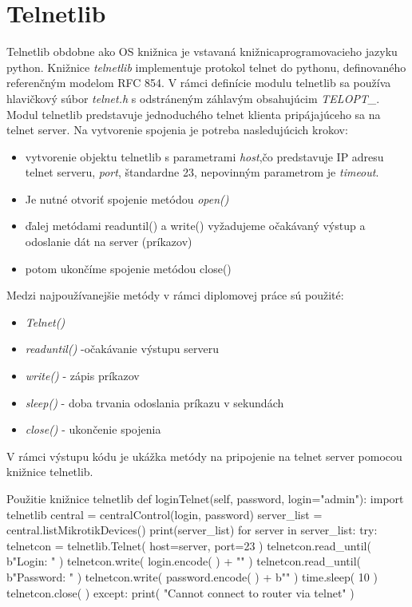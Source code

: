 \section{Telnetlib}
Telnetlib \cite{telnetlib} obdobne ako OS knižnica je vstavaná knižnicaprogramovacieho jazyku python. Knižnice \textit{telnetlib} implementuje protokol telnet do pythonu, definovaného referenčným modelom RFC 854. V rámci definície modulu telnetlib sa používa hlavičkový súbor \textit{telnet.h} s odstráneným záhlavým obsahujúcim \textit{TELOPT\_}. \\Modul telnetlib predstavuje jednoduchého telnet klienta pripájajúceho sa na telnet server. Na vytvorenie spojenia je potreba nasledujúcich krokov:
\begin{itemize}
\item vytvorenie objektu telnetlib s parametrami \textit{host},čo predstavuje IP adresu telnet serveru, \textit{port}, štandardne 23, nepovinným parametrom je \textit{timeout}. 
\item Je nutné otvoriť spojenie metódou \textit{open()}
\item ďalej metódami readuntil() a write() vyžadujeme očakávaný výstup a odoslanie dát na server (príkazov)
\item potom ukončíme spojenie metódou close()
\end{itemize}
Medzi najpoužívanejšie metódy v rámci diplomovej práce sú použité:
\begin{itemize}
\item  \textit{Telnet()}
\item \textit{readuntil()} -očakávanie výstupu serveru
\item \textit{write()} - zápis príkazov
\item \textit{sleep()} - doba trvania odoslania príkazu v sekundách
\item \textit{close()} - ukončenie spojenia
\end{itemize}
V rámci výstupu kódu je ukážka metódy na pripojenie na telnet server pomocou knižnice telnetlib.
\begin{sexylisting}{Použitie knižnice telnetlib}
def loginTelnet(self, password, login="admin"):
 import telnetlib
 central = centralControl(login, password)
 server_list = central.listMikrotikDevices()
 print(server_list)
 for server in server_list:
 try:
  telnetcon = telnetlib.Telnet( host=server, port=23 )
  telnetcon.read_until( b"Login: " )
  telnetcon.write( login.encode( ) + "\n" )
  telnetcon.read_until( b"Password: " )
  telnetcon.write( password.encode( ) + b"\n" )
  time.sleep( 10 )
  telnetcon.close( )
 except:
  print( "Cannot connect to router via telnet" )
\end{sexylisting} 
